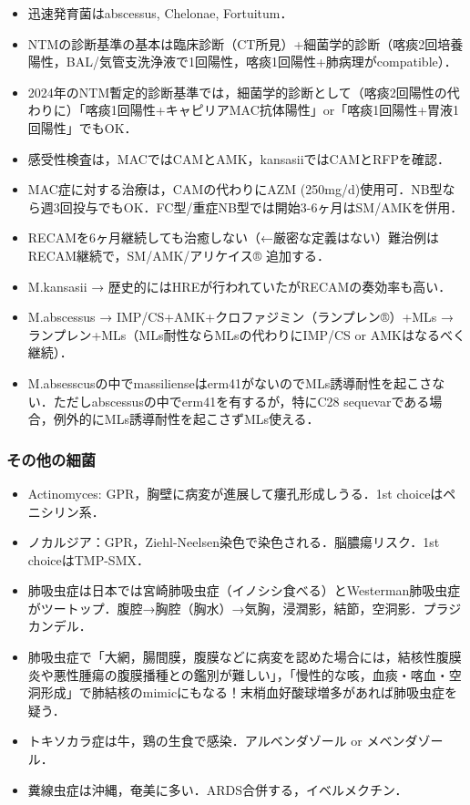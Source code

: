 \begin{itemize}
\item 迅速発育菌はabscessus, Chelonae, Fortuitum．
\item NTMの診断基準の基本は臨床診断（CT所見）+細菌学的診断（喀痰2回培養陽性，BAL/気管支洗浄液で1回陽性，喀痰1回陽性+肺病理がcompatible）．
\item 2024年のNTM暫定的診断基準では，細菌学的診断として（喀痰2回陽性の代わりに）「喀痰1回陽性+キャピリアMAC抗体陽性」or「喀痰1回陽性+胃液1回陽性」でもOK．
\item 感受性検査は，MACではCAMとAMK，kansasiiではCAMとRFPを確認．
\item MAC症に対する治療は，CAMの代わりにAZM (250mg/d)使用可．NB型なら週3回投与でもOK．FC型/重症NB型では開始3-6ヶ月はSM/AMKを併用．
\item RECAMを6ヶ月継続しても治癒しない（←厳密な定義はない）難治例はRECAM継続で，SM/AMK/アリケイス® 追加する．
\item M.kansasii → 歴史的にはHREが行われていたがRECAMの奏効率も高い．
\item M.abscessus → IMP/CS+AMK+クロファジミン（ランプレン®）+MLs → ランプレン+MLs（MLs耐性ならMLsの代わりにIMP/CS or AMKはなるべく継続）．
\item M.absesscusの中でmassilienseはerm41がないのでMLs誘導耐性を起こさない．ただしabscessusの中でerm41を有するが，特にC28 sequevarである場合，例外的にMLs誘導耐性を起こさずMLs使える．
\end{itemize}


\subsubsection{その他の細菌}

\begin{itemize}
\item Actinomyces: GPR，胸壁に病変が進展して瘻孔形成しうる．1st choiceはペニシリン系．
\item ノカルジア：GPR，Ziehl-Neelsen染色で染色される．脳膿瘍リスク．1st choiceはTMP-SMX．
\item 肺吸虫症は日本では宮崎肺吸虫症（イノシシ食べる）とWesterman肺吸虫症がツートップ．腹腔→胸腔（胸水）→気胸，浸潤影，結節，空洞影．プラジカンデル．
\item 肺吸虫症で「大網，腸間膜，腹膜などに病変を認めた場合には，結核性腹膜炎や悪性腫瘍の腹膜播種との鑑別が難しい」，「慢性的な咳，血痰・喀血・空洞形成」で肺結核のmimicにもなる！末梢血好酸球増多があれば肺吸虫症を疑う．
\item トキソカラ症は牛，鶏の生食で感染．アルベンダゾール or メベンダゾール．
\item 糞線虫症は沖縄，奄美に多い．ARDS合併する，イベルメクチン．
\end{itemize}


